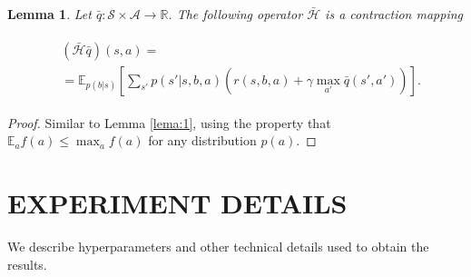 \documentclass[letterpaper]{article} %
\newtheorem{lemma}{Lemma}
\begin{document}

\begin{lemma}
Let $\bar{q} : \mathcal{S} \times \mathcal{A} \rightarrow \mathbb{R}$. The following operator $\bar{\mathcal{H}}$ is a contraction mapping

\begin{align*}
\begin{split}
&(\bar{\mathcal{H}}\bar{q}) (s,a) = \\ &= \mathbb{E}_{p(b|s)} \left[ \sum_{s'} p(s'|s,b,a) \left( r(s,b,a) + \gamma \max_{a'} \bar{q}(s',a') \right) \right].
\end{split}
\end{align*}


\end{lemma}
\begin{proof}
Similar to Lemma \ref{lema:1}, using the property that $\mathbb{E}_{a} f(a) \leq \max_a f(a)$ for any distribution $p(a)$.
\end{proof}









\section{EXPERIMENT DETAILS}\label{sec:exp_det}

We describe hyperparameters and other technical details used to obtain the results.
\end{document}
